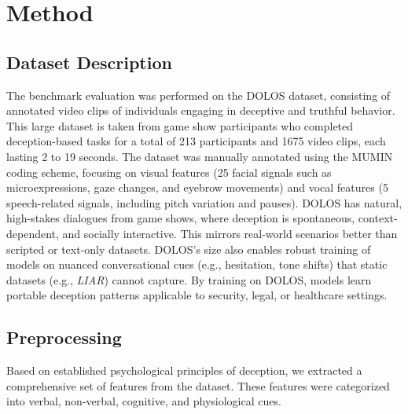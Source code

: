 \documentclass{article} %
\begin{document}
\section{Method}
\subsection{Dataset Description}
The benchmark evaluation was performed on the DOLOS dataset, consisting of annotated video clips of individuals engaging in deceptive and truthful behavior. This large dataset is taken from game show participants who completed deception-based tasks for a total of 213 participants and 1675 video clips, each lasting 2 to 19 seconds. The dataset was manually annotated using the MUMIN \citep{article} coding scheme, focusing on visual features (25 facial signals such as microexpressions, gaze changes, and eyebrow movements) and vocal features (5 speech-related signals, including pitch variation and pauses). DOLOS has natural, high-stakes dialogues from game shows, where deception is spontaneous, context-dependent, and socially interactive. This mirrors real-world scenarios better than scripted or text-only datasets. DOLOS's size also enables robust training of models on nuanced conversational cues (e.g., hesitation, tone shifts) that static datasets (e.g., \textit{LIAR}) cannot capture. By training on DOLOS, models learn portable deception patterns applicable to security, legal, or healthcare settings.

\subsection{Preprocessing}
Based on established psychological principles of deception, we extracted a comprehensive set of features from the dataset. These features were categorized into verbal, non-verbal, cognitive, and physiological cues.
\end{document}
